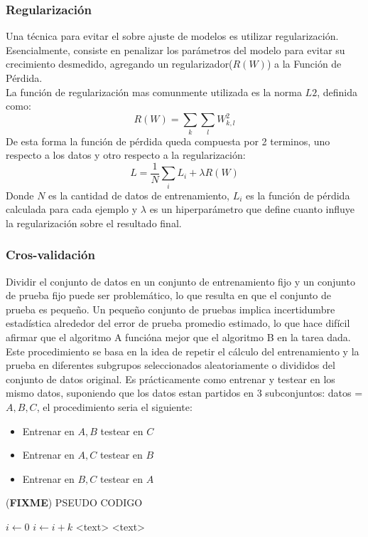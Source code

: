 \documentclass[a4paper,11pt,spanish]{book}
\newcommand*{\FIXME}[1]{{(\textbf{FIXME}) {#1}}}
\begin{document}
	\subsubsection {Regularización}
	  Una técnica para evitar el sobre ajuste de modelos es utilizar regularización. Esencialmente, consiste en penalizar los parámetros del modelo para evitar su
	  crecimiento desmedido, agregando un regularizador($R(W)$) a la Función de Pérdida. \\
	  La función de regularización mas comunmente utilizada es la norma $L2$, definida como:
	   \begin{equation}
	    R(W) = {\sum_{k} {\sum_{l}} W_{k,l}^2}
	   \end{equation}
	   De esta forma la función de pérdida queda compuesta por 2 terminos, uno respecto a los datos y otro respecto a la regularización:
	   \begin{equation}
	    L = {\frac{1}{N}} {\sum_{i} L_{i}} + {\lambda R(W)}
	   \end{equation}
	   Donde $N$ es la cantidad de datos de entrenamiento, $L_{i}$ es la función de pérdida calculada para cada ejemplo y ${\lambda}$ es un hiperparámetro que define 
	   cuanto influye la regularización sobre el resultado final. 
	   
	\subsubsection {Cros-validación}
	  Dividir el conjunto de datos en un conjunto de entrenamiento fijo y un conjunto de prueba fijo puede ser problemático, lo que resulta en que el conjunto de prueba es pequeño. 
	  Un pequeño conjunto de pruebas implica incertidumbre estadística alrededor del error de prueba promedio estimado, lo que hace difícil afirmar que el algoritmo A funcióna mejor que el algoritmo B en la tarea dada.
	  Este procedimiento se basa en la idea de repetir el cálculo del entrenamiento y la prueba en diferentes subgrupos seleccionados aleatoriamente o divididos del conjunto de datos original.
	  Es prácticamente como entrenar y testear en los mismo datos, suponiendo que los datos estan partidos en 3 subconjuntos: datos = ${A,B,C}$, el procedimiento seria el siguiente:
	  \begin{itemize}
	    \item Entrenar en ${A,B}$ testear en ${C}$
	    \item Entrenar en ${A,C}$ testear en ${B}$
	    \item Entrenar en ${B,C}$ testear en ${A}$
	  \end{itemize}
	  \FIXME{PSEUDO CODIGO}
	  	  \begin{algorithmic}
		\State $i\gets 0$
	    \Else
		    \State $i\gets i+k$
		\EndIf
	    \EndIf
	     <text> \EndFor
	     <text> \EndFor
	  \end{algorithmic}
	  
\end{document}
